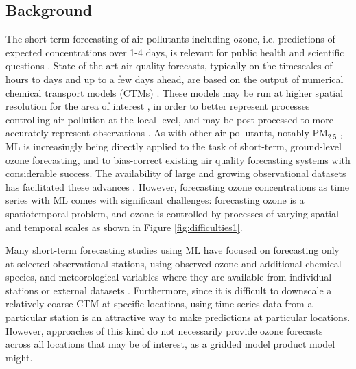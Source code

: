 \documentclass[gmd, manuscript]{copernicus}
\begin{document}
\subsection{Background}
The short-term forecasting of air pollutants including ozone, i.e. predictions of expected concentrations over 1-4 days, is relevant for public health and scientific questions \citep{Buonocore2021, Hahm2021, Alari2021, Saberian2017}. State-of-the-art air quality forecasts, typically on the timescales of hours to days and up to a few days ahead, are based on the output of numerical chemical transport models (CTMs) \citep{Marecal2015}. These models may be run at higher spatial resolution for the area of interest \citep{Savage2013}, in order to better represent processes controlling air pollution at the local level, and may be post-processed to more accurately represent observations \citep{Casciaro2022}. As with other air pollutants, notably PM$_{2.5}$ \citep{Feng2015}, ML is increasingly being directly applied to the task of short-term, ground-level ozone forecasting, and to bias-correct existing air quality forecasting systems with considerable success. The availability of large and growing observational datasets has facilitated these advances \citep{Schultz2017}. However, forecasting ozone concentrations as time series with ML comes with significant challenges: forecasting ozone is a spatiotemporal problem, and ozone is controlled by processes of varying spatial and temporal scales as shown in Figure \ref{fig:difficulties1}.  


Many short-term forecasting studies using ML have focused on forecasting only at selected observational stations, using observed ozone and additional chemical species, and meteorological variables where they are available from individual stations or external datasets \citep{Comrie1997, cobourn_comparison_2000, Kolehmainen2001,Eslami2020, sayeed_novel_2021, leufen_o3resnet_2023, Hickman2023}. Furthermore, since it is difficult to downscale a relatively coarse CTM at specific locations, using time series data from a particular station is an attractive way to make predictions at particular locations. However, approaches of this kind do not necessarily provide ozone forecasts across all locations that may be of interest, as a gridded model product model might.
\end{document}
